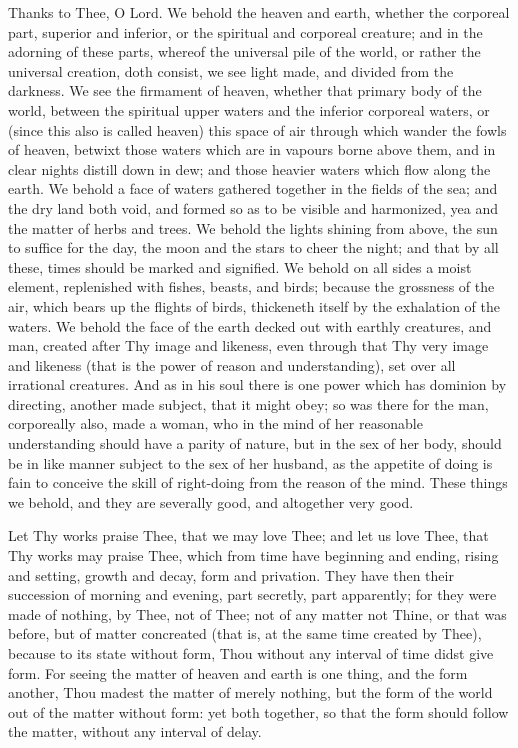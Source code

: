 \documentclass[b5paper,openright,12pt,twoside]{book}
\begin{document}
Thanks to Thee, O Lord. We behold the heaven and earth, whether the
corporeal part, superior and inferior, or the spiritual and corporeal
creature; and in the adorning of these parts, whereof the universal pile
of the world, or rather the universal creation, doth consist, we see
light made, and divided from the darkness. We see the firmament of
heaven, whether that primary body of the world, between the spiritual
upper waters and the inferior corporeal waters, or (since this also
is called heaven) this space of air through which wander the fowls of
heaven, betwixt those waters which are in vapours borne above them, and
in clear nights distill down in dew; and those heavier waters which flow
along the earth. We behold a face of waters gathered together in the
fields of the sea; and the dry land both void, and formed so as to be
visible and harmonized, yea and the matter of herbs and trees. We behold
the lights shining from above, the sun to suffice for the day, the moon
and the stars to cheer the night; and that by all these, times should
be marked and signified. We behold on all sides a moist element,
replenished with fishes, beasts, and birds; because the grossness of
the air, which bears up the flights of birds, thickeneth itself by the
exhalation of the waters. We behold the face of the earth decked out
with earthly creatures, and man, created after Thy image and likeness,
even through that Thy very image and likeness (that is the power of
reason and understanding), set over all irrational creatures. And as
in his soul there is one power which has dominion by directing, another
made subject, that it might obey; so was there for the man, corporeally
also, made a woman, who in the mind of her reasonable understanding
should have a parity of nature, but in the sex of her body, should be in
like manner subject to the sex of her husband, as the appetite of doing
is fain to conceive the skill of right-doing from the reason of
the mind. These things we behold, and they are severally good, and
altogether very good.

Let Thy works praise Thee, that we may love Thee; and let us love Thee,
that Thy works may praise Thee, which from time have beginning and
ending, rising and setting, growth and decay, form and privation. They
have then their succession of morning and evening, part secretly, part
apparently; for they were made of nothing, by Thee, not of Thee; not of
any matter not Thine, or that was before, but of matter concreated (that
is, at the same time created by Thee), because to its state without
form, Thou without any interval of time didst give form. For seeing
the matter of heaven and earth is one thing, and the form another, Thou
madest the matter of merely nothing, but the form of the world out of
the matter without form: yet both together, so that the form should
follow the matter, without any interval of delay.
\end{document}
